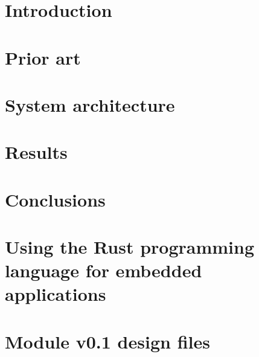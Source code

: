 \documentclass[oneside]{ctuthesis}
\theoremstyle{plain}
\theoremstyle{definition}
\theoremstyle{note}
\begin{document}
\maketitle


\chapter{\label{chapter:introduction} Introduction}

\chapter{\label{chapter:prior} Prior art}

\chapter{\label{chapter:architecture} System architecture}

\chapter{\label{chapter:results} Results}

\chapter{Conclusions}

\printindex

\begin{appendices}
\chapter{Using the Rust programming language for embedded applications}

\chapter{Module v0.1 design files}

\end{appendices}




\end{document}
